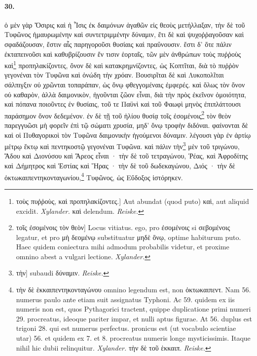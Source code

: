 \documentclass[a4paper, 11pt, oneside, polutonikogreek, german]{article}
\begin{document}
\paragraph{30.}
ὁ μὲν γὰρ Ὄσιρις καὶ ἡ Ἶσις ἐκ δαιμόνων ἀγαθῶν εἰς θεοὺς μετήλλαξαν, τὴν δὲ τοῦ Τυφῶνος ἠμαυρωμένην καὶ συντετριμμένην δύναμιν, ἔτι δὲ καὶ ψυχοῤῥαγοῦσαν καὶ σφαδάζουσαν, ἔστιν αἷς παρηγοροῦσι θυσίαις καὶ πραΰνουσιν. ἔστι δ' ὅτε πάλιν ἐκταπεινοῦσι καὶ καθυβρίζουσιν ἔν τισιν ἑορταῖς, τῶν μὲν ἀνθρώπων τοὺς πυῤῥοὺς καὶ\footnote{τοὺς πυῤῥοὺς, καὶ προπηλακίζοντες.] Aut abundat (quod puto) καὶ, aut aliquid excidit. \emph{Xylander.} καὶ delendum. \emph{Reiske.}} προπηλακίζοντες, ὄνον δὲ καὶ κατακρημνίζοντες, ὡς Κοπτῖται, διὰ τὸ πυῤῥὸν γεγονέναι τὸν Τυφῶνα καὶ ὀνώδη τὴν χρόαν. Βουσιρῖται δὲ καὶ Λυκοπολῖται σάλπιγξιν οὐ χρῶνται τοπαράπαν, ὡς ὄνῳ φθεγγομέναις ἐμφερές. καὶ ὅλως τὸν ὄνον οὐ καθαρὸν, ἀλλὰ δαιμονικὸν, ἡγοῦνται ζῶον εἶναι, διὰ τὴν πρὸς ἐκεῖνον ὁμοιότητα, καὶ πόπανα ποιοῦντες ἐν θυσίαις, τοῦ τε Παϋνὶ καὶ τοῦ Φαωφὶ μηνὸς ἐπιπλάττουσι παράσημον ὄνον δεδεμένον. ἐν δὲ τῇ τοῦ ἡλίου θυσίᾳ τοῖς ἐσομένοις\footnote{τοῖς ἐσομένοις τὸν θεὸν] Locus vitiatus. ego, pro ἐσομένοις si σεβομένοις legatur, et pro μὴ δεομένῳ substituatur μηδὲ ὂνῳ, optime habiturum puto. Haec quidem coniectura mihi admodum probabilis videtur, et proxime omnino abest a vulgari lectione. \emph{Xylander.}} τὸν θεὸν παρεγγυῶσι μὴ φορεῖν ἐπὶ τῷ σώματι χρυσία, μηδ' ὄνῳ τροφὴν διδόναι. φαίνονται δὲ καὶ οἱ Πυθαγορικοὶ τὸν Τυφῶνα δαιμονικὴν ἡγούμενοι δύναμιν. λέγουσι γὰρ ἐν ἀρτίῳ μέτρῳ ἕκτῳ καὶ πεντηκοστῷ γεγονέναι Τυφῶνα. καὶ πάλιν τὴν\footnote{τὴν] subaudi δύναμιν. \emph{Reiske.}} μὲν τοῦ τριγώνου, Ἅδου καὶ Διονύσου καὶ Ἄρεος εἶναι · τὴν δὲ τοῦ τετραγώνου, Ῥέας, καὶ Ἀφροδίτης καὶ Δήμητρος καὶ Ἑστίας καὶ Ἥρας · τὴν δὲ τοῦ δωδεκαγώνου, Διός · τὴν δὲ ὀκτωκαιπεντηκονταγωνίου,\footnote{τὴν δὲ ἑκκαιπεντηκονταγώνου omnino legendum est, non ὀκτωκαιπεντ. Nam 56. numerus paulo ante etiam suit assignatus Typhoni. Ac 59. quidem ex iis numeris non est, quos Pythagorici tractent, quippe duplicatione primi numeri 29. procreatus, ideoque pariter impar, et nulli aptus figurae. At 56. duplus est trigoni 28. qui est numerus perfectus. pronicus est (ut vocabulo scientiae utar) 56. et quidem ex 7. et 8. procreatus numeris longe mysticissimis. Itaque nihil hic dubii relinquitur. \emph{Xylander.} τὴν δὲ τοῦ ἑκκαιπ. \emph{Reiske.}} Τυφῶνος, ὡς Εὔδοξος ἱστόρηκεν.
\end{document}
